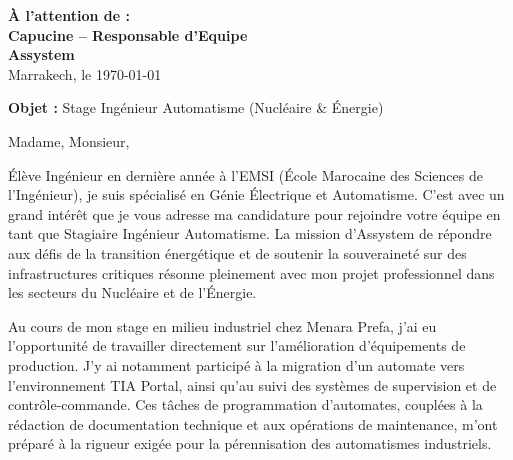 \documentclass[10pt,a4paper]{../../altacv}
\makeatletter
\renewcommand{\makecvheader}{%
  \begingroup
    \raggedright\color{emphasis}%
    {\Huge\bfseries\MakeUppercase{\@name}\par}
    \medskip
    {\large\bfseries\color{accent}\@tagline\par}
    \medskip
    {\footnotesize\bfseries\@personalinfo\par}
  \endgroup\medskip
}
\makeatother
\begin{document}

\makecvheader

\bigskip
\medskip

\begin{flushright}
  {\color{emphasis}\textbf{À l'attention de :}} \\[2pt]
  \textbf{Capucine -- Responsable d'Equipe} \\
  \textbf{Assystem} \\[20pt]
  Marrakech, le \today
\end{flushright}
\bigskip

\bigskip

{\color{accent}\textbf{Objet :}} Stage Ingénieur Automatisme (Nucléaire \& Énergie)

\bigskip\bigskip

Madame, Monsieur,

\vspace{0.4cm}

Élève Ingénieur en dernière année à l'EMSI (École Marocaine des Sciences de l'Ingénieur), je suis spécialisé en Génie Électrique et Automatisme. C'est avec un grand intérêt que je vous adresse ma candidature pour rejoindre votre équipe en tant que Stagiaire Ingénieur Automatisme. La mission d'Assystem de répondre aux défis de la transition énergétique et de soutenir la souveraineté sur des infrastructures critiques résonne pleinement avec mon projet professionnel dans les secteurs du Nucléaire et de l'Énergie.

\vspace{0.4cm}

Au cours de mon stage en milieu industriel chez Menara Prefa, j'ai eu l'opportunité de travailler directement sur l'amélioration d'équipements de production. J'y ai notamment participé à la migration d'un automate vers l'environnement TIA Portal, ainsi qu'au suivi des systèmes de supervision et de contrôle-commande. Ces tâches de programmation d'automates, couplées à la rédaction de documentation technique et aux opérations de maintenance, m'ont préparé à la rigueur exigée pour la pérennisation des automatismes industriels.
\end{document}
